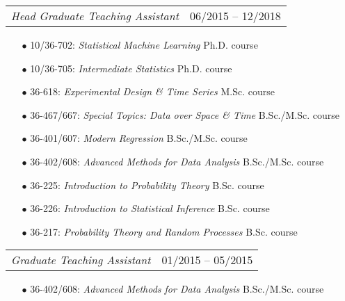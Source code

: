 \documentclass[letterpaper,10pt]{article}
\makeatletter
\newcommand{\subheadingoneline}[2]{
\begin{tabular*}{6.45in}{l@{\cftdotfill{\cftsecdotsep}\extracolsep{\fill}}r}
#1 & #2 \\ 
\end{tabular*}}
\makeatother
\begin{document}
\begin{itemize}[leftmargin=0.4cm]
\vspace{0.02cm}
\item[] \hspace{-2ex}\subheadingoneline{\it Head Graduate Teaching Assistant}{06/2015 -- 12/2018}
\begin{itemize}[leftmargin=0.4cm, rightmargin=0.3cm]
\item[$\bullet$]10/36-702: \hspace{1.5ex}\emph{Statistical Machine Learning} \hfill Ph.D. course
\item[$\bullet$]10/36-705: \hspace{0.5ex} \emph{Intermediate Statistics} \hfill Ph.D. course
\item[$\bullet$]36-618: \hspace{5ex}\emph{Experimental Design \& Time Series} \hfill M.Sc. course
\item[$\bullet$]36-467/667:\hspace{0.25ex}  \emph{Special Topics: Data over Space \& Time} \hfill B.Sc./M.Sc. course
\item[$\bullet$]36-401/607: \hspace{0.25ex}\emph{Modern Regression} \hfill B.Sc./M.Sc. course
\item[$\bullet$]36-402/608: \hspace{0.25ex}\emph{Advanced Methods for Data Analysis} \hfill B.Sc./M.Sc. course
\item[$\bullet$]36-225: \hspace{5ex}\emph{Introduction to Probability Theory} \hfill B.Sc. course
\item[$\bullet$]36-226: \hspace{5ex}\emph{Introduction to Statistical Inference} \hfill B.Sc. course
\item[$\bullet$]36-217: \hspace{5ex}\emph{Probability Theory and Random Processes} \hfill B.Sc. course
\end{itemize}

\vspace{0.05cm}

\item[] \hspace{-2.2ex}\subheadingoneline{\it Graduate Teaching Assistant}{01/2015 -- 05/2015}
\begin{itemize}[leftmargin=0.4cm, rightmargin=0.3cm]
\item[$\bullet$]36-402/608: \hspace{0.25ex}\emph{Advanced Methods for Data Analysis} \hfill B.Sc./M.Sc. course
\end{itemize}

\end{itemize}
\end{document}

